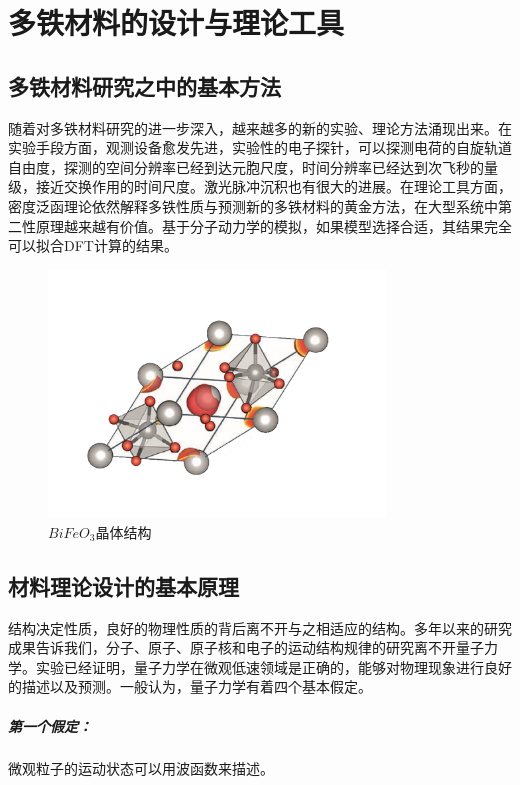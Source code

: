 \chapter{多铁材料的设计与理论工具}

\section{多铁材料研究之中的基本方法}

随着对多铁材料研究的进一步深入，越来越多的新的实验、理论方法涌现出来。在实验手段方面，观测设备愈发先进，实验性的电子探针，可以探测电荷的自旋轨道自由度，探测的空间分辨率已经到达元胞尺度，时间分辨率已经达到次飞秒的量级，接近交换作用的时间尺度。激光脉冲沉积也有很大的进展。在理论工具方面，密度泛函理论依然解释多铁性质与预测新的多铁材料的黄金方法\cite{zhong1994phase}，在大型系统中第二性原理越来越有价值。基于分子动力学的模拟，如果模型选择合适，其结果完全可以拟合DFT计算的结果。
\begin{figure}[h]
    \centering
\includegraphics[width=0.8\textwidth]{./pic/007-2.png}
\caption{$BiFeO_{3}$晶体结构}
\label{dog007}
\end{figure}

\section{材料理论设计的基本原理}

结构决定性质，良好的物理性质的背后离不开与之相适应的结构。多年以来的研究成果告诉我们，分子、原子、原子核和电子的运动结构规律的研究离不开量子力学。实验已经证明，量子力学在微观低速领域是正确的，能够对物理现象进行良好的描述以及预测。一般认为，量子力学有着四个基本假定。
\paragraph{第一个假定：}微观粒子的运动状态可以用波函数来描述。
